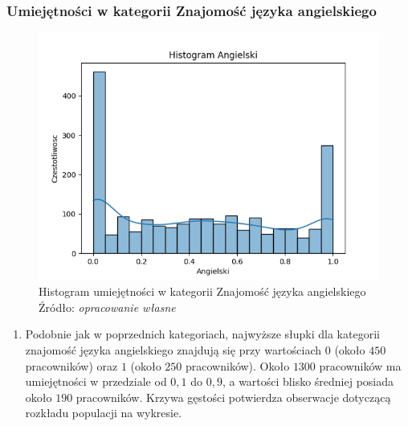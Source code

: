         \subsubsection{Umiejętności w kategorii Znajomość języka angielskiego}
        \begin{figure}[H]
            \centering
            \includegraphics[width=\linewidth]{chapters/Images/hist_angielski.png}
            \cprotect\caption{Histogram umiejętności w kategorii Znajomość języka angielskiego\\ Źródło:\textit{ opracowanie własne}}
            \label{fig:hist_ang}
        \end{figure}

        \begin{enumerate}
            \item Podobnie jak w poprzednich kategoriach, najwyższe słupki dla kategorii znajomość języka angielskiego znajdują się przy wartościach $0$ (około $450$ pracowników) oraz $1$ (około $250$ pracowników). Około $1300$ pracowników ma umiejętności w przedziale od $0,1$ do $0,9$, a wartości blisko średniej posiada około $190$ pracowników. Krzywa gęstości potwierdza obserwacje dotyczącą rozkładu populacji na wykresie.
        \end{enumerate}
        

